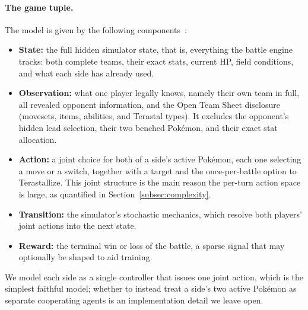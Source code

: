 \paragraph{The game tuple.}
The model is given by the following components~\cite{karten2025pokeagent}:
\begin{itemize}
  \item \textbf{State:} the full hidden simulator state, that is, everything the
        battle engine tracks: both complete teams, their exact stats, current HP,
        field conditions, and what each side has already used.
  \item \textbf{Observation:} what one player legally knows, namely their own team
        in full, all revealed opponent information, and the Open Team Sheet
        disclosure (movesets, items, abilities, and Terastal types). It excludes
        the opponent's hidden lead selection, their two benched Pok\'{e}mon, and
        their exact stat allocation.
  \item \textbf{Action:} a joint choice for both of a side's active Pok\'{e}mon,
        each one selecting a move or a switch, together with a target and the
        once-per-battle option to Terastallize. This joint structure is the main
        reason the per-turn action space is large, as quantified in
        Section~\ref{subsec:complexity}.
  \item \textbf{Transition:} the simulator's stochastic mechanics, which resolve
        both players' joint actions into the next state.
  \item \textbf{Reward:} the terminal win or loss of the battle, a sparse signal
        that may optionally be shaped to aid training.
\end{itemize}

We model each side as a single controller that issues one joint action, which is
the simplest faithful model; whether to instead treat a side's two active
Pok\'{e}mon as separate cooperating agents is an implementation detail we leave
open.
